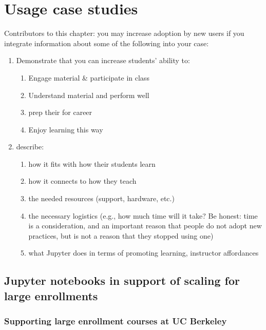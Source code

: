 \documentclass[]{book}
\providecommand{\tightlist}{%
  \setlength{\itemsep}{0pt}\setlength{\parskip}{0pt}}
\begin{document}
\chapter{Usage case studies}\label{case-studies}

Contributors to this chapter: you may increase adoption by new users if
you integrate information about some of the following into your case:

\begin{enumerate}
\def\labelenumi{\arabic{enumi}.}
\tightlist
\item
  Demonstrate that you can increase students' ability to:

  \begin{enumerate}
  \def\labelenumii{\arabic{enumii}.}
  \tightlist
  \item
    Engage material \& participate in class
  \item
    Understand material and perform well
  \item
    prep their for career
  \item
    Enjoy learning this way
  \end{enumerate}
\item
  describe:

  \begin{enumerate}
  \def\labelenumii{\arabic{enumii}.}
  \tightlist
  \item
    how it fits with how their students learn
  \item
    how it connects to how they teach
  \item
    the needed resources (support, hardware, etc.)
  \item
    the necessary logistics (e.g., how much time will it take? Be
    honest: time is a consideration, and an important reason that people
    do not adopt new practices, but is not a reason that they stopped
    using one)
  \item
    what Jupyter does in terms of promoting learning, instructor
    affordances
  \end{enumerate}
\end{enumerate}

\section{Jupyter notebooks in support of scaling for large
enrollments}\label{jupyter-notebooks-in-support-of-scaling-for-large-enrollments}

\subsection{Supporting large enrollment courses at UC
Berkeley}\label{supporting-large-enrollment-courses-at-uc-berkeley}
\end{document}

